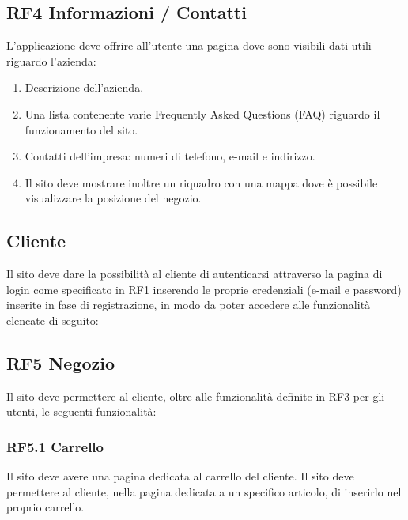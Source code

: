 \documentclass{report}
\begin{document}
\subsection*{RF4 Informazioni / Contatti}
L’applicazione deve offrire all’utente una pagina dove sono visibili dati utili riguardo l'azienda:

\begin{enumerate}
	\item Descrizione dell'azienda.
	\item Una lista contenente varie Frequently Asked Questions (FAQ) riguardo il funzionamento del sito.
	\item Contatti dell’impresa: numeri di telefono, e-mail e indirizzo.
	\item Il sito deve mostrare inoltre un riquadro con una mappa dove è possibile visualizzare la posizione del negozio.
\end{enumerate}


\subsection{Cliente}
Il sito deve dare la possibilità al cliente di autenticarsi attraverso la pagina di login come specificato in RF1 inserendo le proprie credenziali (e-mail e password) inserite in fase di registrazione, in modo da poter accedere alle funzionalità elencate di seguito:

\subsection*{RF5 Negozio}
Il sito deve permettere al cliente, oltre alle funzionalità definite in RF3 per gli utenti, le seguenti funzionalità:

\subsubsection{RF5.1 Carrello}
Il sito deve avere una pagina dedicata al carrello del cliente.
Il sito deve permettere al cliente, nella pagina dedicata a un specifico articolo, di inserirlo nel proprio carrello.
\end{document}
